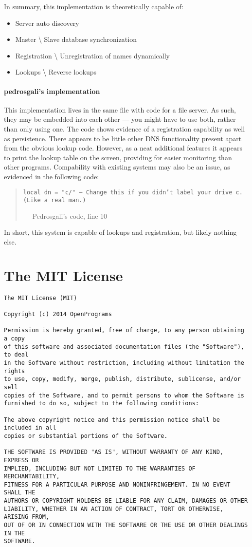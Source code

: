\documentclass[]{report}
\begin{document}
In summary, this implementation is theoretically capable of:
\begin{itemize}
	\item Server auto discovery
	\item Master \textbackslash{} Slave database synchronization
	\item Registration \textbackslash{} Unregistration of names dynamically
	\item Lookups \textbackslash{} Reverse lookups
\end{itemize}
\subsubsection{pedrosgali's implementation}
This implementation lives in the same file with code for a file server. As such, they may be embedded into each other --- you might have to use both, rather than only using one. The code shows evidence of a registration capability as well as persistence. There appears to be little other DNS functionality present apart from the obvious lookup code. However, as a neat additional features it appears to print the lookup table on the screen, providing for easier monitoring than other programs. Compability with existing systems may also be an issue, as evidenced in the following code:
\begin{quote}
	\texttt{local dn = "c/" -- Change this if you didn't label your drive c. (Like a real man.)}
	
	--- Pedrosgali's code, line 10
\end{quote}
In short, this system is capable of lookups and registration, but likely nothing else. 
\appendix
\chapter{The MIT License}\label{mit}
\begin{verbatim}
The MIT License (MIT)

Copyright (c) 2014 OpenPrograms

Permission is hereby granted, free of charge, to any person obtaining a copy
of this software and associated documentation files (the "Software"), to deal
in the Software without restriction, including without limitation the rights
to use, copy, modify, merge, publish, distribute, sublicense, and/or sell
copies of the Software, and to permit persons to whom the Software is
furnished to do so, subject to the following conditions:

The above copyright notice and this permission notice shall be included in all
copies or substantial portions of the Software.

THE SOFTWARE IS PROVIDED "AS IS", WITHOUT WARRANTY OF ANY KIND, EXPRESS OR
IMPLIED, INCLUDING BUT NOT LIMITED TO THE WARRANTIES OF MERCHANTABILITY,
FITNESS FOR A PARTICULAR PURPOSE AND NONINFRINGEMENT. IN NO EVENT SHALL THE
AUTHORS OR COPYRIGHT HOLDERS BE LIABLE FOR ANY CLAIM, DAMAGES OR OTHER
LIABILITY, WHETHER IN AN ACTION OF CONTRACT, TORT OR OTHERWISE, ARISING FROM,
OUT OF OR IN CONNECTION WITH THE SOFTWARE OR THE USE OR OTHER DEALINGS IN THE
SOFTWARE.
\end{verbatim}
\end{document}
